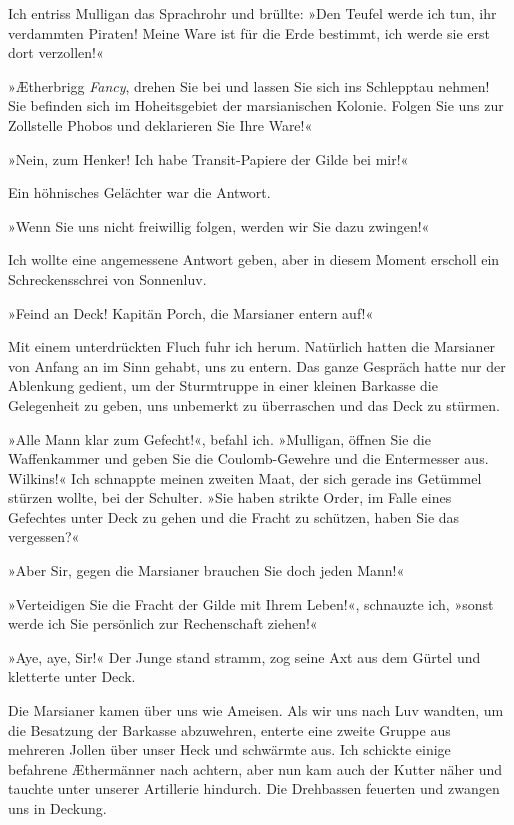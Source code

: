 Ich entriss Mulligan das Sprachrohr und brüllte: »Den Teufel werde
ich tun, ihr verdammten Piraten! Meine Ware ist für die Erde
bestimmt, ich werde sie erst dort verzollen!«

»Ætherbrigg \emph{Fancy}, drehen Sie bei und lassen Sie sich ins
Schlepptau nehmen! Sie befinden sich im Hoheitsgebiet der
marsianischen Kolonie. Folgen Sie uns zur Zollstelle Phobos und
deklarieren Sie Ihre Ware!«

»Nein, zum Henker! Ich habe Transit-Papiere der Gilde bei mir!«

Ein höhnisches Gelächter war die Antwort.

»Wenn Sie uns nicht freiwillig folgen, werden wir Sie dazu
zwingen!«

Ich wollte eine angemessene Antwort geben, aber in diesem Moment
erscholl ein Schreckensschrei von Sonnenluv.

»Feind an Deck! Kapitän Porch, die Marsianer entern auf!«

Mit einem unterdrückten Fluch fuhr ich herum. Natürlich hatten die
Marsianer von Anfang an im Sinn gehabt, uns zu entern. Das ganze
Gespräch hatte nur der Ablenkung gedient, um der Sturmtruppe in
einer kleinen Barkasse die Gelegenheit zu geben, uns unbemerkt zu
überraschen und das Deck zu stürmen.

\bigpar

»Alle Mann klar zum Gefecht!«, befahl ich. »Mulligan, öffnen Sie
die Waffenkammer und geben Sie die Coulomb-Gewehre und die
Entermesser aus. Wilkins!« Ich schnappte meinen zweiten Maat, der
sich gerade ins Getümmel stürzen wollte, bei der Schulter. »Sie
haben strikte Order, im Falle eines Gefechtes unter Deck zu gehen
und die Fracht zu schützen, haben Sie das vergessen?«

»Aber Sir, gegen die Marsianer brauchen Sie doch jeden Mann!«

»Verteidigen Sie die Fracht der Gilde mit Ihrem Leben!«, schnauzte
ich, »sonst werde ich Sie persönlich zur Rechenschaft ziehen!«

»Aye, aye, Sir!« Der Junge stand stramm, zog seine Axt aus dem
Gürtel und kletterte unter Deck.

\bigpar

Die Marsianer kamen über uns wie Ameisen. Als wir uns nach Luv
wandten, um die Besatzung der Barkasse abzuwehren, enterte eine
zweite Gruppe aus mehreren Jollen über unser Heck und schwärmte
aus. Ich schickte einige befahrene Æthermänner nach achtern, aber
nun kam auch der Kutter näher und tauchte unter unserer Artillerie
hindurch. Die Drehbassen feuerten und zwangen uns in Deckung.

